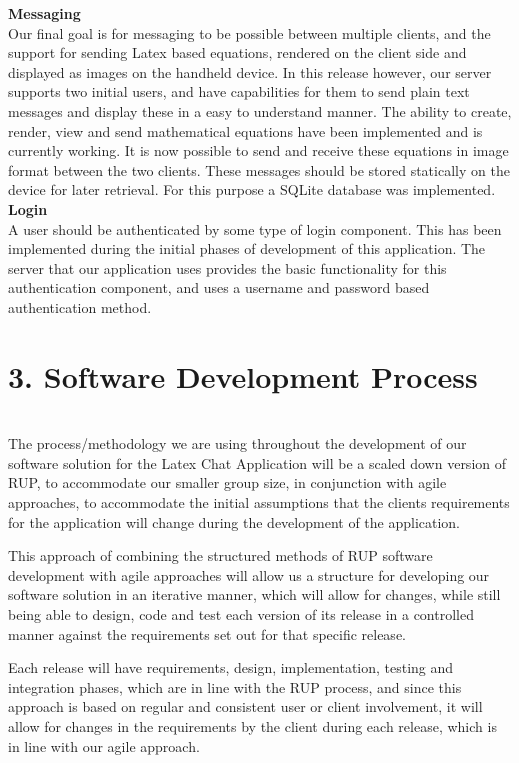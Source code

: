 \documentclass[29pt,a4paper]{moderncv}
\begin{document}
		
		\noindent\textbf{Messaging}
		\\Our final goal is for messaging to be possible between multiple clients, and the support for sending Latex based equations, rendered on the client side and displayed as images on the handheld device. In this release however, our server supports two initial users, and have capabilities for them to send plain text messages and display these in a easy to understand manner.  
		\parindent 5mm The ability to create, render, view and send mathematical equations have been implemented and is currently working. It is now possible to send and receive these equations in image format between the two clients.
		These messages should be stored statically on the device for later retrieval.  For this purpose a SQLite database was implemented.\\
		
		\noindent\textbf{Login}
		\\A user should be authenticated by some type of login component.  This has been implemented during the initial phases of development of this application.  The server that our application uses provides the basic functionality for this authentication component, and uses a username and password based authentication method.
		
\newpage
	\section*{3. Software Development Process}
	\vspace{4mm}
	\\The process/methodology we are using throughout the development of our software solution for the Latex Chat Application will be a scaled down version of RUP, to accommodate our smaller group size, in conjunction with agile approaches, to accommodate the initial assumptions that the clients requirements for the application will change during the development of the application.
	
	This approach of combining the structured methods of RUP software development with agile approaches will allow us a structure for developing our software solution in an iterative manner, which will allow for changes, while still being able to design, code and test each version of its release in a controlled manner against the requirements set out for that specific release.
	
	Each release will have requirements, design, implementation, testing and integration phases, which are in line with the RUP process, and since this approach is based on regular and consistent user or client involvement, it will allow for changes in the requirements by the client during each release, which is in line with our agile approach.
	
\end{document}
